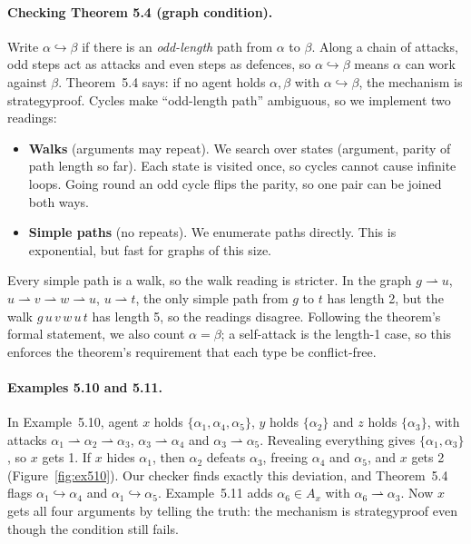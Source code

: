\documentclass[11pt,a4paper]{article}
\newcommand{\A}[1]{\alpha_{#1}}
\newcommand{\att}{\rightharpoonup}
\newcommand{\ind}{\hookrightarrow}
\begin{document}
\paragraph{Checking Theorem 5.4 (graph condition).} Write
$\alpha \ind \beta$ if there is an \emph{odd-length} path from $\alpha$ to
$\beta$. Along a chain of attacks, odd steps act as attacks and even steps as
defences, so $\alpha \ind \beta$ means $\alpha$ can work against $\beta$.
Theorem~5.4 says: if no agent holds $\alpha, \beta$ with $\alpha \ind \beta$,
the mechanism is strategyproof. Cycles make ``odd-length path'' ambiguous, so
we implement two readings:
\begin{itemize}
  \item \textbf{Walks} (arguments may repeat). We search over states
        (argument, parity of path length so far). Each state is visited once,
        so cycles cannot cause infinite loops. Going round an odd cycle flips
        the parity, so one pair can be joined both ways.
  \item \textbf{Simple paths} (no repeats). We enumerate paths directly. This
        is exponential, but fast for graphs of this size.
\end{itemize}
Every simple path is a walk, so the walk reading is stricter. In the graph
$g \att u$, $u \att v \att w \att u$, $u \att t$, the only simple path from
$g$ to $t$ has length 2, but the walk $g\,u\,v\,w\,u\,t$ has length 5, so the
readings disagree. Following the theorem's formal statement, we also count
$\alpha = \beta$; a self-attack is the length-1 case, so this enforces the
theorem's requirement that each type be conflict-free.

\paragraph{Examples 5.10 and 5.11.} In Example~5.10, agent $x$ holds
$\{\A1,\A4,\A5\}$, $y$ holds $\{\A2\}$ and $z$ holds $\{\A3\}$, with attacks
$\A1 \att \A2 \att \A3$, $\A3 \att \A4$ and $\A3 \att \A5$. Revealing
everything gives $\{\A1, \A3\}$, so $x$ gets 1. If $x$ hides $\A1$, then
$\A2$ defeats $\A3$, freeing $\A4$ and $\A5$, and $x$ gets 2
(Figure~\ref{fig:ex510}). Our checker finds exactly this deviation, and
Theorem~5.4 flags $\A1 \ind \A4$ and $\A1 \ind \A5$. Example~5.11 adds
$\A6 \in A_x$ with $\A6 \att \A3$. Now $x$ gets all four arguments by telling
the truth: the mechanism is strategyproof even though the condition still
fails.
\end{document}
